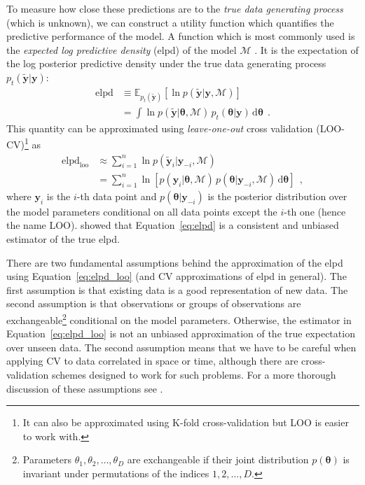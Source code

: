 \documentclass[12pt,dvipsnames]{report}
\newcommand{\ud}{\,\mathrm{d}}
\renewcommand{\vec}[1]{\boldsymbol{\mathbf{#1}}}
\newcommand{\hquad}{~~}
\begin{document}
To measure how close these predictions are to the \emph{true data generating process} 
(which is unknown), we can construct a utility function which quantifies the 
predictive performance of the model.  A function which is most commonly used is the 
\emph{expected log predictive density} (elpd) of the model $\mathcal{M}$
\citep[see][for a discussion of list of other common choices]{arXiv:1912.11218v2}.
It is the expectation of the log posterior predictive density under the true data 
generating process $p_t(\tilde{\vec y}|\vec y)$:
\begin{align}
    \mathrm{elpd}&\equiv\mathbb{E}_{p_t(\tilde{\vec y})}\left[ \ln p(\tilde{\vec y}|\vec y,\mathcal{M})\right]\\
    &= \int \ln p(\tilde{\vec y}|\vec \theta,\mathcal{M})\,p_t(\vec \theta|\vec y)\ud\vec \theta
    \hquad.
    \label{eq:elpd}
\end{align}
This quantity can be approximated using \emph{leave-one-out} cross validation (LOO-CV)\footnote{
    It can also be approximated using K-fold cross-validation but LOO is easier to work with.
}
as \citep{vehtari2017}
\begin{align}
\mathrm{elpd}_\mathrm{loo}&\approx \sum_{i=1}^n \ln p(\tilde{\vec y}_i|\vec y_{-i},\mathcal{M})\\
&=\sum_{i=1}^n\ln\left[p(\vec y_i|\vec \theta,\mathcal{M})\,p(\vec \theta | \vec y_{-i},\mathcal{M})\ud\vec\theta\right]
\hquad,
\label{eq:elpd_loo}
\end{align}
where $\vec y_i$ is the $i$-th data point and $p(\vec \theta|\vec y_{-i})$ is the 
posterior distribution over the model parameters conditional on all data points except 
the $i$-th one (hence the name LOO). 
\citet{arXiv:1004.2316} showed that Equation~\ref{eq:elpd} is a consistent and unbiased 
estimator of the true elpd.

There are two fundamental assumptions behind the approximation of the elpd using 
Equation~\ref{eq:elpd_loo} (and CV approximations of elpd in general).
The first assumption is that existing data is a good representation
of new data. The second assumption is that observations or groups of observations are 
exchangeable\footnote{Parameters $\theta_1,\theta_2,\ldots,\theta_D$ are
exchangeable if their joint distribution $p(\vec \theta)$ is invariant under permutations
of the indices $1,2,\ldots,D$.} conditional on the model parameters. Otherwise, the 
estimator in Equation~\ref{eq:elpd_loo} is not an unbiased approximation of the true 
expectation over unseen data. The second assumption means that we have to be careful when 
applying CV to data correlated in space or time, although there are cross-validation
schemes designed to work for such problems. For a more thorough discussion of these 
assumptions see \citet{arXiv:1810.05374}.
\end{document}
